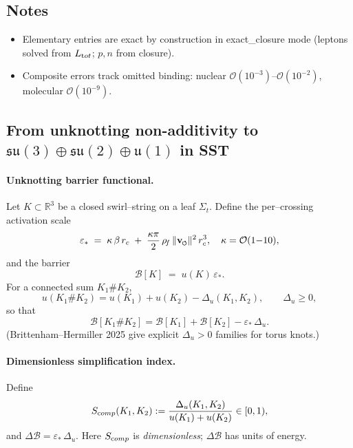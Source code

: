 \documentclass[11pt]{article}
\newcommand{\swirlarrow}{%
     \mathchoice{\mkern-2mu\scriptstyle\boldsymbol{\circlearrowleft}}%
                {\mkern-2mu\scriptstyle\boldsymbol{\circlearrowleft}}%
                {\mkern-2mu\scriptscriptstyle\boldsymbol{\circlearrowleft}}%
                {\mkern-2mu\scriptscriptstyle\boldsymbol{\circlearrowleft}}%
}
\newcommand{\vswirl}{\mathbf{v}_{\swirlarrow}}
\newcommand{\vnorm}{\lVert \vswirl \rVert}               %
\newcommand{\rhof}{\rho_{\!f}}                           %
\newcommand{\rc}{r_c}                                    %
\begin{document}
\subsection*{Notes}
\begin{itemize}
    \item Elementary entries are exact by construction in exact\_closure mode (leptons solved from $L_{\textrm tot}$; $p,n$ from closure).
    \item Composite errors track omitted binding: nuclear $\mathcal O(10^{-3})$–$\mathcal O(10^{-2})$, molecular $\mathcal O(10^{-9})$.
\end{itemize}


\subsection*{From unknotting non-additivity to \(\mathfrak{su}(3)\oplus\mathfrak{su}(2)\oplus\mathfrak u(1)\) in SST}

\paragraph{Unknotting barrier functional.}
    Let \(K\subset\mathbb R^3\) be a closed swirl–string on a leaf \(\Sigma_t\).
    Define the per–crossing activation scale
    \[
        \varepsilon_*\;=\;\kappa\,\beta\,\rc\;+\;\frac{\kappa\pi}{2}\,\rhof\,\vnorm^2\,\rc^3,
        \quad \kappa=\mathcal O(1{-}10),
    \]
    and the barrier
    \[
        \mathcal B[K]\;=\;u(K)\,\varepsilon_*.
    \]
    For a connected sum \(K_1\#K_2\),
    \[
        u(K_1\#K_2)=u(K_1)+u(K_2)-\Delta_u(K_1,K_2),\qquad \Delta_u\ge 0,
    \]
    so that
    \[
        \mathcal B[K_1\#K_2]=\mathcal B[K_1]+\mathcal B[K_2]-\varepsilon_*\,\Delta_u.
    \]
    (Brittenham–Hermiller 2025 give explicit \(\Delta_u>0\) families for torus knots.)

\paragraph{Dimensionless simplification index.}
    Define
    \[
        S_{\textrm comp}(K_1,K_2):=\frac{\Delta_u(K_1,K_2)}{u(K_1)+u(K_2)}\in[0,1),
    \]
    and \(\Delta\mathcal B=\varepsilon_*\,\Delta_u\). Here \(S_{\textrm comp}\) is \emph{dimensionless}; \(\Delta\mathcal B\) has units of energy.
\end{document}
